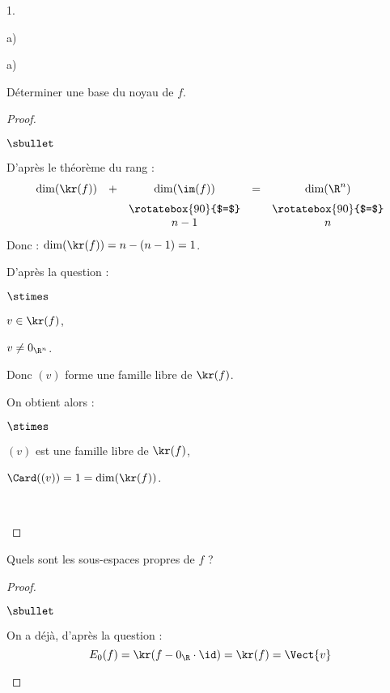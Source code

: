 \documentclass[11pt]{article}%
\begin{document}
\begin{noliste}{1.}
\begin{noliste}{a)}
 \end{noliste}
 
 \item 
 \begin{noliste}{a)}
  \setlength{\itemsep}{1mm}
  \item Déterminer une base du noyau de $f$.
  
  \begin{proof}~
   \begin{noliste}{$\sbullet$}
    \item D'après le théorème du rang :
    \[
     \begin{array}{ccccc}
      \dim(\kr(f)) & + & \dim(\im(f)) & = & \dim(\R^n)
      \\[.2cm]
       & & \rotatebox{90}{$=$} & & \rotatebox{90}{$=$}
      \\
      & & n-1 & & n
     \end{array}
    \]
    Donc : $\dim(\kr(f))=n-(n-1)=1$.
    
    \item D'après la question  :
    \begin{noliste}{$\stimes$}
      \item $v\in \kr(f)$,
      \item $v \neq 0_{\R^n}$.
    \end{noliste}
    Donc $(v)$ forme une famille libre de $\kr(f)$.

    

    
    \item On obtient alors :
    \begin{noliste}{$\stimes$}
      \item $(v)$ est une famille libre de $\kr(f)$,
      \item $\Card((v)) = 1 = \dim(\kr(f))$.
    \end{noliste}
    ~\\[-1.4cm]
   \end{noliste}
  \end{proof}

  
  \item Quels sont les sous-espaces propres de $f$ ?
  
  \begin{proof}~
   \begin{noliste}{$\sbullet$}
    \item On a déjà, d'après la question  :
    \[
     E_0(f)=\kr(f- 0_{\R} \cdot \id) = \kr(f) 
     =\Vect{v}
    \]
        

\end{noliste}
\end{proof}
\end{noliste}
\end{noliste}
\end{document}
